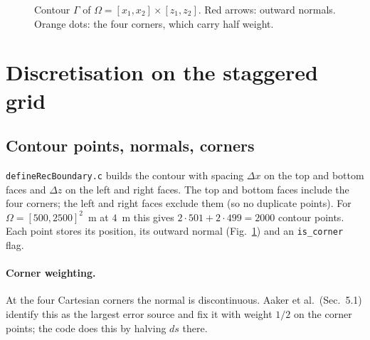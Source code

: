 \documentclass[11pt,a4paper]{article}
\newcommand{\nn}{\mathbf n}
\begin{document}
\begin{figure}[h]
\centering
{}
\caption{Contour $\Gamma$ of $\Omega=[x_1,x_2]\times[z_1,z_2]$. Red arrows: outward normals.
Orange dots: the four corners, which carry half weight.}
\label{fig:geom}
\end{figure}

\section{Discretisation on the staggered grid}
\subsection{Contour points, normals, corners}
\texttt{defineRecBoundary.c} builds the contour with spacing $\Delta x$ on the top
and bottom faces and $\Delta z$ on the left and right faces. The top and bottom
faces include the four corners; the left and right faces exclude them (so no
duplicate points). For $\Omega=[500,2500]^2$~m at $4$~m this gives
$2\cdot501+2\cdot499=2000$ contour points. Each point stores its position, its
outward normal (Fig.~\ref{fig:geom}) and an \texttt{is\_corner} flag.

\paragraph{Corner weighting.}
At the four Cartesian corners the normal is discontinuous. Aaker et al.\ (Sec.~5.1)
identify this as the largest error source and fix it with weight $1/2$ on the
corner points; the code does this by halving $ds$ there.
\end{document}
